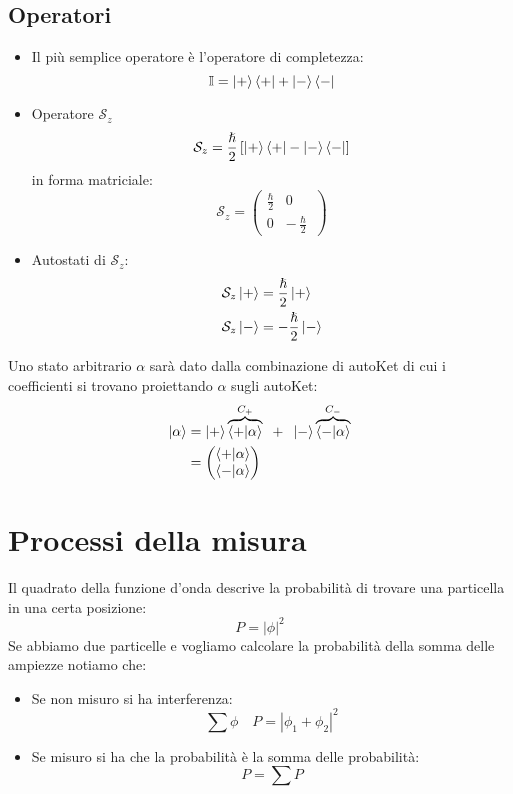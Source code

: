 \documentclass[a4paper]{article}
\begin{document}
\subsection{Operatori}
\begin{itemize}
  \item 
    Il più semplice operatore è l'operatore di completezza:
    \[
      \mathbb{I} = \ket{+} \bra{+} + \ket{-} \bra{-}
    \] 

  \item Operatore \( \mathcal{S}_z \) 
    \[
      \mathcal{S}_z = \frac{\hslash}{2} \left[ \ket{+}\bra{+} - \ket{-}\bra{-} \right]
    \]
    in forma matriciale:
    \[
      \mathcal{S}_z = 
      \begin{pmatrix} 
        \frac{\hslash}{2} & 0\\
        0 & -\frac{\hslash}{2}
      \end{pmatrix} 
    \] 

  \item Autostati di \( \mathcal{S}_z \):
    \[
      \begin{aligned}
        \mathcal{S}_z \ket{+} &= \frac{\hslash}{2} \ket{+}\\
        \mathcal{S}_z \ket{-} &= -\frac{\hslash}{2} \ket{-}
      \end{aligned}
    \] 
\end{itemize}

\noindent
Uno stato arbitrario \( \alpha \) sarà dato dalla combinazione di autoKet di cui i coefficienti
si trovano proiettando \( \alpha \) sugli autoKet:
\[
  \begin{aligned}
    \ket{\alpha} &= \ket{+} \overbrace{\braket{+}{\alpha}}^{C_+} \;\; + \;\;
    \ket{-} \overbrace{\braket{-}{\alpha}}^{C_-}\\
                 &= \begin{pmatrix} 
                   \braket{+}{\alpha}\\
                   \braket{-}{\alpha}
                 \end{pmatrix} 
  \end{aligned}
\] 

\section{Processi della misura}
Il quadrato della funzione d'onda descrive la probabilità di trovare una particella in una
certa posizione:
\[
  P = |\phi|^2
\] 
Se abbiamo due particelle e vogliamo calcolare la probabilità della somma delle ampiezze
notiamo che:
\begin{itemize}
  \item Se non misuro si ha interferenza:
    \[
    \sum \phi \quad P = |\phi_1 + \phi_2|^2
    \] 

  \item Se misuro si ha che la probabilità è la somma delle probabilità:
    \[
      P = \sum P
    \]
\end{itemize}
\end{document}
